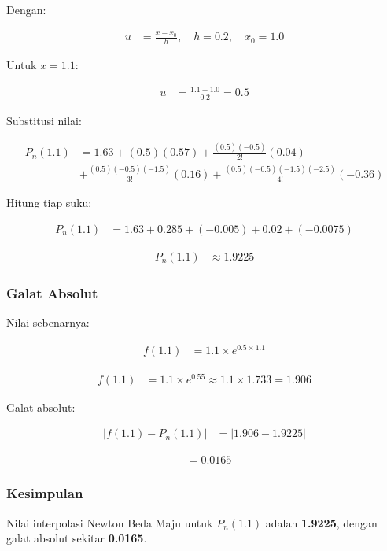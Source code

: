 \documentclass{article}
\begin{document}
Dengan:

\begin{align*}
    u &= \frac{x - x_0}{h}, \quad h = 0.2, \quad x_0 = 1.0
\end{align*}

Untuk $x = 1.1$:

\begin{align*}
    u &= \frac{1.1 - 1.0}{0.2} = 0.5
\end{align*}

Substitusi nilai:

\begin{align*}
    P_n(1.1) &= 1.63 + (0.5)(0.57) + \frac{(0.5)(-0.5)}{2!} (0.04) \\
    &+ \frac{(0.5)(-0.5)(-1.5)}{3!} (0.16) + \frac{(0.5)(-0.5)(-1.5)(-2.5)}{4!} (-0.36)
\end{align*}

Hitung tiap suku:

\begin{align*}
    P_n(1.1) &= 1.63 + 0.285 + (-0.005) + 0.02 + (-0.0075)
\end{align*}

\begin{align*}
    P_n(1.1) &\approx 1.9225
\end{align*}

\subsubsection{Galat Absolut}
Nilai sebenarnya:

\begin{align*}
    f(1.1) &= 1.1 \times e^{0.5 \times 1.1}
\end{align*}

\begin{align*}
    f(1.1) &= 1.1 \times e^{0.55} \approx 1.1 \times 1.733 = 1.906
\end{align*}

Galat absolut:

\begin{align*}
    | f(1.1) - P_n(1.1) | &= | 1.906 - 1.9225 |
\end{align*}

\begin{align*}
    &= 0.0165
\end{align*}

\subsubsection{Kesimpulan}
Nilai interpolasi Newton Beda Maju untuk $P_n(1.1)$ adalah \textbf{1.9225}, dengan galat absolut sekitar \textbf{0.0165}.
\end{document}
